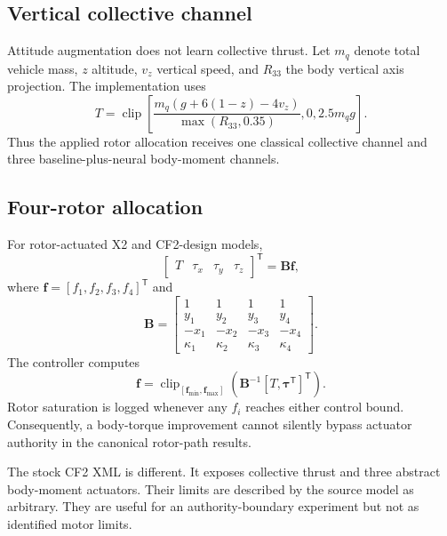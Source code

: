 \documentclass[10pt,twocolumn]{article}
\newcommand{\clip}{\operatorname{clip}}
\newcommand{\T}{^{\mathsf T}}
\begin{document}
\subsection{Vertical collective channel}

Attitude augmentation does not learn collective thrust. Let $m_q$ denote total
vehicle mass, $z$ altitude, $v_z$ vertical speed, and $R_{33}$ the body vertical
axis projection. The implementation uses
\begin{equation}
    T=\clip\left[
    \frac{m_q(g+6(1-z)-4v_z)}{\max(R_{33},0.35)},
    0,2.5m_qg\right].
\end{equation}
Thus the applied rotor allocation receives one classical collective channel
and three baseline-plus-neural body-moment channels.

\subsection{Four-rotor allocation}

For rotor-actuated X2 and CF2-design models,
\begin{equation}
    \begin{bmatrix}T&\tau_x&\tau_y&\tau_z\end{bmatrix}\T
    =\bm B\bm f,
\end{equation}
where $\bm f=[f_1,f_2,f_3,f_4]\T$ and
\begin{equation}
    \bm B=
    \begin{bmatrix}
    1&1&1&1\\
    y_1&y_2&y_3&y_4\\
    -x_1&-x_2&-x_3&-x_4\\
    \kappa_1&\kappa_2&\kappa_3&\kappa_4
    \end{bmatrix}.
\end{equation}
The controller computes
\begin{equation}
    \bm f=\clip_{[\bm f_{\min},\bm f_{\max}]}
    \left(\bm B^{-1}
    [T,\bm\tau\T]\T\right).
\end{equation}
Rotor saturation is logged whenever any $f_i$ reaches either control bound.
Consequently, a body-torque improvement cannot silently bypass actuator
authority in the canonical rotor-path results.

The stock CF2 XML is different. It exposes collective thrust and three abstract
body-moment actuators. Their limits are described by the source model as
arbitrary. They are useful for an authority-boundary experiment but not as
identified motor limits.
\end{document}
